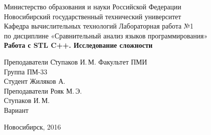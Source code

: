 \begin{titlepage}
    \begin{center}
        Министерство образования и науки Российской Федерации\\
        Новосибирский государственный технический университет\\
        Кафедра вычислительных технологий
        \vfill
        \Large
        Лабораторная работа №1\\ 
        по дисциплине «Сравнительный анализ языков программирования»\\
        \Huge
        \textbf{Работа с STL C++. Исследование сложности}
    \end{center}

    \vfill

    \begin{tabbing}
        Преподаватели \quad\= Ступаков И.\,М.\kill
        Факультет \> ПМИ\\
        Группа \> ПМ-33\\
        Студент \> Жиляков А.\\
        Преподаватели \> Рояк М.\,Э.\\
                      \> Ступаков И.\,М.\\
        Вариант 
    \end{tabbing}

    \vfill

    \begin{center}
        Новосибирск, 2016
    \end{center}
\end{titlepage} 